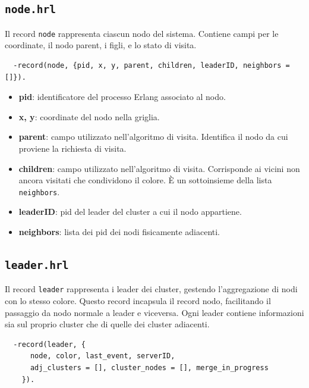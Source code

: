 \documentclass[12pt, a4paper]{report}
\begin{document}
\subsection{\texttt{node.hrl}}

Il record \texttt{node} rappresenta ciascun nodo del sistema. Contiene campi per le coordinate, il nodo parent, i figli, e lo stato di visita.

\begin{tcolorbox}[title=Definizione del record \texttt{node}]
\begin{verbatim}
  -record(node, {pid, x, y, parent, children, leaderID, neighbors = []}).
\end{verbatim}
\end{tcolorbox}

\begin{itemize}
    \item \textbf{pid}: identificatore del processo Erlang associato al nodo.
    \item \textbf{x, y}: coordinate del nodo nella griglia.
    \item \textbf{parent}: campo utilizzato nell'algoritmo di visita. Identifica il nodo da cui proviene la richiesta di visita.
    \item \textbf{children}: campo utilizzato nell'algoritmo di visita. Corrisponde ai vicini non ancora visitati che condividono il colore. \`E un sottoinsieme della lista \texttt{neighbors}.
    \item \textbf{leaderID}: pid del leader del cluster a cui il nodo appartiene.
    \item \textbf{neighbors}: lista dei pid dei nodi fisicamente adiacenti.
\end{itemize}

\subsection{\texttt{leader.hrl}}

Il record \texttt{leader} rappresenta i leader dei cluster, gestendo l’aggregazione di nodi con lo stesso colore. Questo record incapsula il record nodo, facilitando il passaggio da nodo normale a leader e viceversa. Ogni leader contiene informazioni sia sul proprio cluster che di quelle dei cluster adiacenti.

\begin{tcolorbox}[title=Definizione del record \texttt{leader}]
\begin{verbatim}
  -record(leader, {
      node, color, last_event, serverID,
      adj_clusters = [], cluster_nodes = [], merge_in_progress
    }).
\end{verbatim}
\end{tcolorbox}
\end{document}
